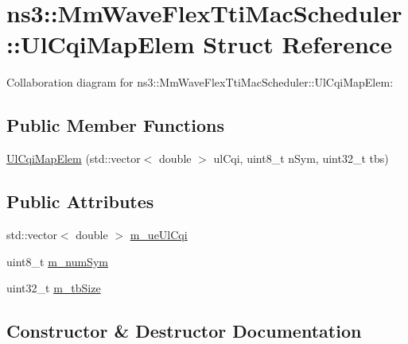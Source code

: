 \hypertarget{structns3_1_1MmWaveFlexTtiMacScheduler_1_1UlCqiMapElem}{}\section{ns3\+:\+:Mm\+Wave\+Flex\+Tti\+Mac\+Scheduler\+:\+:Ul\+Cqi\+Map\+Elem Struct Reference}
\label{structns3_1_1MmWaveFlexTtiMacScheduler_1_1UlCqiMapElem}


Collaboration diagram for ns3\+:\+:Mm\+Wave\+Flex\+Tti\+Mac\+Scheduler\+:\+:Ul\+Cqi\+Map\+Elem\+:
\subsection*{Public Member Functions}
\begin{DoxyCompactItemize}
\item 
\hyperlink{structns3_1_1MmWaveFlexTtiMacScheduler_1_1UlCqiMapElem_ad5836f518fc2414ac6ca9cec8d81d380}{Ul\+Cqi\+Map\+Elem} (std\+::vector$<$ double $>$ ul\+Cqi, uint8\+\_\+t n\+Sym, uint32\+\_\+t tbs)
\end{DoxyCompactItemize}
\subsection*{Public Attributes}
\begin{DoxyCompactItemize}
\item 
std\+::vector$<$ double $>$ \hyperlink{structns3_1_1MmWaveFlexTtiMacScheduler_1_1UlCqiMapElem_a6d9c9c342d782b6926f1fe70b9e73337}{m\+\_\+ue\+Ul\+Cqi}
\item 
uint8\+\_\+t \hyperlink{structns3_1_1MmWaveFlexTtiMacScheduler_1_1UlCqiMapElem_a73ccb9456503fa00c37a62d1e0682e9e}{m\+\_\+num\+Sym}
\item 
uint32\+\_\+t \hyperlink{structns3_1_1MmWaveFlexTtiMacScheduler_1_1UlCqiMapElem_aeeb0d1a9f28aa86a4a2dad990b28c239}{m\+\_\+tb\+Size}
\end{DoxyCompactItemize}


\subsection{Constructor \& Destructor Documentation}
